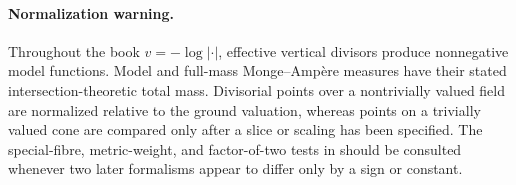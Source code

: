 \paragraph{Normalization warning.}
\label{front:part1-normalization-warning}
Throughout the book \(v=-\log|\cdot|\), effective vertical divisors produce
nonnegative model functions. Model and full-mass Monge--Amp\`ere measures
have their stated intersection-theoretic total mass.  Divisorial points over a nontrivially
valued field are normalized relative to the ground valuation, whereas points
on a trivially valued cone are compared only after a slice or scaling has
been specified.  The special-fibre, metric-weight, and factor-of-two tests in
 should be consulted whenever two later formalisms
appear to differ only by a sign or constant.
